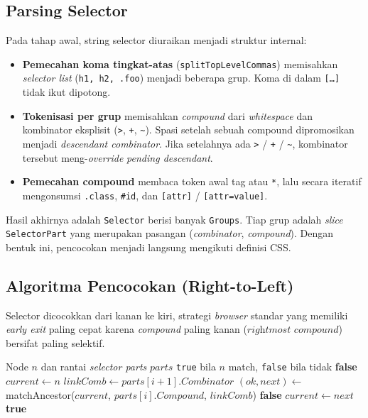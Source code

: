 \subsection{Parsing Selector}
Pada tahap awal, string selector diuraikan menjadi struktur internal:
\begin{itemize}
    \item \textbf{Pemecahan koma tingkat-atas} (\texttt{splitTopLevelCommas}) memisahkan \textit{selector list} (\texttt{h1, h2, .foo}) menjadi beberapa grup. Koma di dalam \texttt{[\dots]} tidak ikut dipotong.
    \item \textbf{Tokenisasi per grup} memisahkan \textit{compound} dari \textit{whitespace} dan kombinator eksplisit (\texttt{>}, \texttt{+}, \texttt{\textasciitilde}). Spasi setelah sebuah compound dipromosikan menjadi \textit{descendant combinator}. Jika setelahnya ada \texttt{>} / \texttt{+} / \texttt{\textasciitilde}, kombinator tersebut meng-\textit{override} \textit{pending descendant}.
    \item \textbf{Pemecahan compound} membaca token awal tag atau \texttt{*}, lalu secara iteratif mengonsumsi \texttt{.class}, \texttt{\#id}, dan \texttt{[attr]} / \texttt{[attr=value]}.
\end{itemize}

Hasil akhirnya adalah \texttt{Selector} berisi banyak \texttt{Groups}. Tiap grup adalah \textit{slice} \texttt{SelectorPart} yang merupakan pasangan (\textit{combinator}, \textit{compound}). Dengan bentuk ini, pencocokan menjadi langsung mengikuti definisi CSS.

\subsection{Algoritma Pencocokan (Right-to-Left)}
Selector dicocokkan dari kanan ke kiri, strategi \textit{browser} standar yang memiliki \textit{early exit} paling cepat karena \textit{compound} paling kanan ($\textit{rightmost compound}$) bersifat paling selektif.

\begin{algorithm}[H]
\caption{matchSelectorGroup(n, parts)}
\begin{algorithmic}[1]
\Require Node $n$ dan rantai \textit{selector parts} $\mathit{parts}$
\Ensure \texttt{true} bila $n$ match, \texttt{false} bila tidak
    \State \Return \textbf{false}
\EndIf
\State $current \gets n$
    \State $linkComb \gets \mathit{parts}[i+1].Combinator$
    \State $(ok, next) \gets$ matchAncestor($current$, $\mathit{parts}[i].Compound$, $linkComb$)
     \State \Return \textbf{false} \EndIf
    \State $current \gets next$
\EndFor
\State \Return \textbf{true}
\end{algorithmic}
\end{algorithm}

